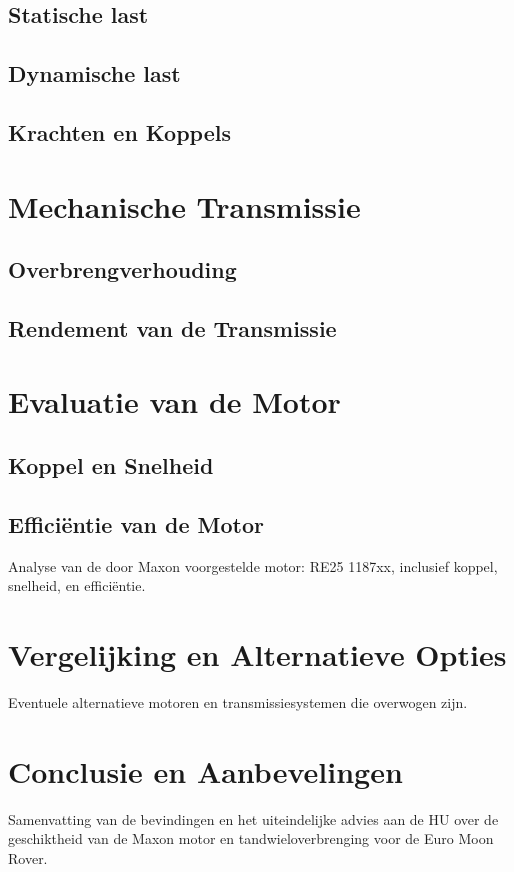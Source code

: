 \documentclass{article}
\begin{document}
\subsection{Statische last}

\subsection{Dynamische last}
\subsection{Krachten en Koppels}

\section{Mechanische Transmissie}
\subsection{Overbrengverhouding}
\subsection{Rendement van de Transmissie}

\section{Evaluatie van de Motor}
\subsection{Koppel en Snelheid}
\subsection{Efficiëntie van de Motor}
    Analyse van de door Maxon voorgestelde motor: RE25 1187xx, inclusief koppel, snelheid, en efficiëntie.

\section{Vergelijking en Alternatieve Opties}
    Eventuele alternatieve motoren en transmissiesystemen die overwogen zijn.

\section{Conclusie en Aanbevelingen}
    Samenvatting van de bevindingen en het uiteindelijke advies aan de HU over de geschiktheid van de Maxon motor en tandwieloverbrenging voor de Euro Moon Rover.

\appendix
\end{document}
